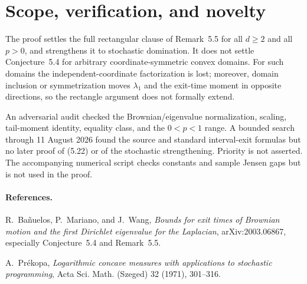 \documentclass[10pt]{article}
\begin{document}
\section{Scope, verification, and novelty}

The proof settles the full rectangular clause of Remark~5.5 for all
$d\ge2$ and all $p>0$, and strengthens it to stochastic domination.  It does
not settle Conjecture~5.4 for arbitrary coordinate-symmetric convex domains.
For such domains the independent-coordinate factorization is lost; moreover,
domain inclusion or symmetrization moves $\lambda_1$ and the exit-time moment
in opposite directions, so the rectangle argument does not formally extend.

An adversarial audit checked the Brownian/eigenvalue normalization, scaling,
tail-moment identity, equality class, and the $0<p<1$ range.  A bounded search
through 11 August 2026 found the source and standard interval-exit formulas
but no later proof of (5.22) or of the stochastic strengthening.  Priority is
not asserted.  The accompanying numerical script checks constants and sample
Jensen gaps but is not used in the proof.

\paragraph{References.}
R.~Bañuelos, P.~Mariano, and J.~Wang,
\emph{Bounds for exit times of Brownian motion and the first Dirichlet
eigenvalue for the Laplacian}, arXiv:2003.06867, especially Conjecture~5.4 and
Remark~5.5.

A.~Prékopa, \emph{Logarithmic concave measures with applications to
stochastic programming}, Acta Sci. Math. (Szeged) 32 (1971), 301--316.
\end{document}
